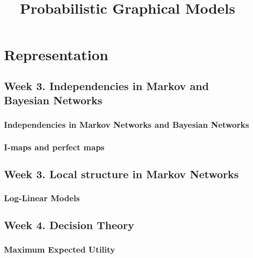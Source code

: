 \documentclass[a4paper,10pt]{article}
\title{Probabilistic Graphical Models}
\author{}
\begin{document}
\maketitle

\section{Representation}

\subsection{Week 3. Independencies in Markov and Bayesian Networks}

\subsubsection{Independencies in Markov Networks and Bayesian Networks}



\subsubsection{I-maps and perfect maps}



\subsection{Week 3. Local structure in Markov Networks}

\subsubsection{Log-Linear Models}




\subsection{Week 4. Decision Theory}

\subsubsection{Maximum Expected Utility}


\end{document}

